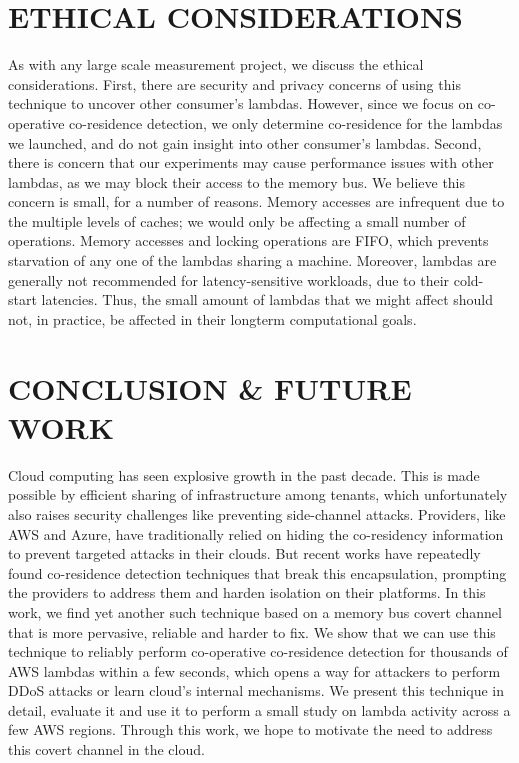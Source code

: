 
\section{ETHICAL CONSIDERATIONS}
As with any large scale measurement project, we discuss the ethical
considerations. First, there are security and privacy concerns of using this
technique to uncover other consumer's lambdas. However, since we focus on
co-operative co-residence detection, we only determine co-residence for the
lambdas we launched, and do not gain insight into other consumer's lambdas.
Second, there is concern that our experiments may cause performance issues with
other lambdas, as we may block their access to the memory bus. We believe this
concern is small, for a number of reasons. Memory accesses are infrequent due to
the multiple levels of caches; we would only be affecting a small number of
operations. Memory accesses and locking operations are FIFO, which prevents
starvation of any one of the lambdas sharing a machine. Moreover, lambdas are
generally not recommended for latency-sensitive workloads, due to their
cold-start latencies. Thus, the small amount of lambdas that we might affect
should not, in practice, be affected in their longterm computational goals. 


\section{CONCLUSION \& FUTURE WORK}
\label{sec:conclusion}
Cloud computing has seen explosive growth in the past decade. This is made
possible by efficient sharing of infrastructure among tenants, which
unfortunately also raises security challenges like preventing side-channel
attacks. Providers, like AWS and Azure, have traditionally relied on hiding the
co-residency information to prevent targeted attacks in their clouds. But recent
works have repeatedly found co-residence detection techniques that break this
encapsulation, prompting the providers to address them and harden isolation on
their platforms. In this work, we find yet another such technique based on a
memory bus covert channel that is more pervasive, reliable and harder to fix. We
show that we can use this technique to reliably perform co-operative
co-residence detection for thousands of AWS lambdas within a few seconds, which
opens a way for attackers to perform DDoS attacks or learn cloud's internal
mechanisms. We present this technique in detail, evaluate it and use it to
perform a small study on lambda activity across a few AWS regions.  Through this
work, we hope to motivate the need to address this covert channel in the cloud.

